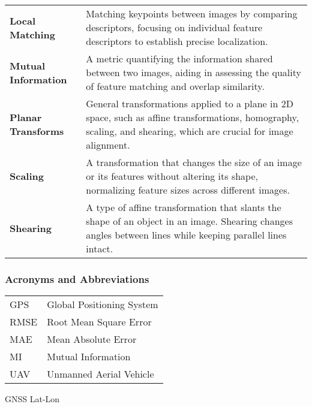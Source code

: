 \begin{tabularx}{\textwidth}{@{}p{2.5cm}L}
    \textbf{Local Matching} & 
    Matching keypoints between images by comparing descriptors, focusing on individual feature descriptors to establish precise localization. \\

    \textbf{Mutual Information} & 
    A metric quantifying the information shared between two images, aiding in assessing the quality of feature matching and overlap similarity. \\

    \textbf{Planar Transforms} & 
    General transformations applied to a plane in 2D space, such as affine transformations, homography, scaling, and shearing, which are crucial for image alignment. \\

    \textbf{Scaling} & 
    A transformation that changes the size of an image or its features without altering its shape, normalizing feature sizes across different images. \\

    \textbf{Shearing} & 
    A type of affine transformation that slants the shape of an object in an image. Shearing changes angles between lines while keeping parallel lines intact. \\

\end{tabularx}
\endgroup

\newpage
\subsubsection*{Acronyms and Abbreviations}

\begingroup
\renewcommand{\arraystretch}{1.2}
\begin{tabular}{@{}p{2.5cm} l}
    GPS     & Global Positioning System \\
    RMSE    & Root Mean Square Error \\
    MAE     & Mean Absolute Error \\
    MI      & Mutual Information \\
    UAV     & Unmanned Aerial Vehicle \\
\end{tabular}
\endgroup


GNSS
Lat-Lon